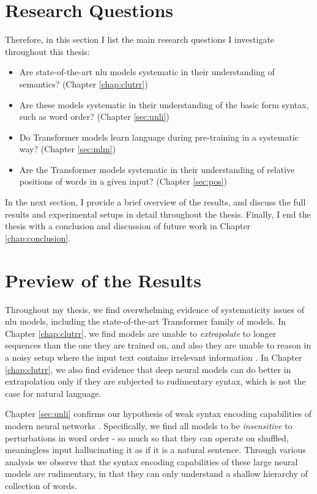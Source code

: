 \documentclass[letterpaper, 12pt]{report}
\begin{document}
\section{Research Questions}

Therefore, in this section I list the main research questions I investigate throughout this thesis:

\begin{itemize}
  \item Are state-of-the-art \acrshort{nlu} models systematic in their understanding of semantics? (Chapter \autoref{chap:clutrr})
  \item Are these models systematic in their understanding of the basic form syntax, such as word order? (Chapter \autoref{sec:unli})
  \item Do Transformer models learn language during pre-training in a systematic way? (Chapter \autoref{sec:mlm})
  \item Are the Transformer models systematic in their understanding of relative positions of words in a given input? (Chapter \autoref{sec:pos})
\end{itemize}

In the next section, I provide a brief overview of the results, and discuss the full results and experimental setups in detail throughout the thesis. Finally, I end the thesis with a conclusion and discussion of future work in Chapter \autoref{chap:conclusion}.

\section{Preview of the Results}

Throughout my thesis, we find overwhelming evidence of systematicity issues of \acrshort{nlu} models, including the state-of-the-art Transformer family of models. In Chapter \autoref{chap:clutrr}, we find models are unable to \textit{extrapolate} to longer sequences than the one they are trained on, and also they are unable to reason in a noisy setup where the input text contains irrelevant information \citep{sinha-etal-2019-clutrr}. In Chapter \autoref{chap:clutrr}, we also find evidence that deep neural models can do better in extrapolation only if they are subjected to rudimentary syntax, which is not the case for natural language.

Chapter \autoref{sec:unli} confirms our hypothesis of weak syntax encoding capabilities of modern neural networks \citep{sinha-etal-2021-unnatural}. Specifically, we find all models to be \textit{insensitive} to perturbations in word order - so much so that they can operate on shuffled, meaningless input hallucinating it as if it is a natural sentence. Through various analysis we observe that the syntax encoding capabilities of these large neural models are rudimentary, in that they can only understand a shallow hierarchy of collection of words.
\end{document}
